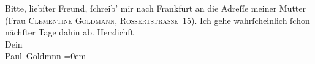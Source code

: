 \begin{ledgroupsized}[t]{13cm}
           \pstart
           Bitte, liebſter Freund, ſchreib’ mir nach Frankfurt an die Adreſſe meiner Mutter (Frau \textsc{Clementine Goldmann}, \textsc{Rossertstraſse 15}). Ich gehe wahrſcheinlich ſchon nächſter Tage dahin ab.\pend
           \pstart
           Herzlichſt {\\[\baselineskip]}Dein {\\[\baselineskip]}\spacefill\mbox{Paul Goldmnn}\pend
           \leftskip=0em{}
         
         \endnumbering{}\end{ledgroupsized}  \newcommand{\dateiname}{L02842}\newcommand{\titel}{Paul Goldmann an Arthur Schnitzler, 10. 3. [1898]}\newcommand{\editorInnen}{Martin Anton Müller und Laura Untner}
      